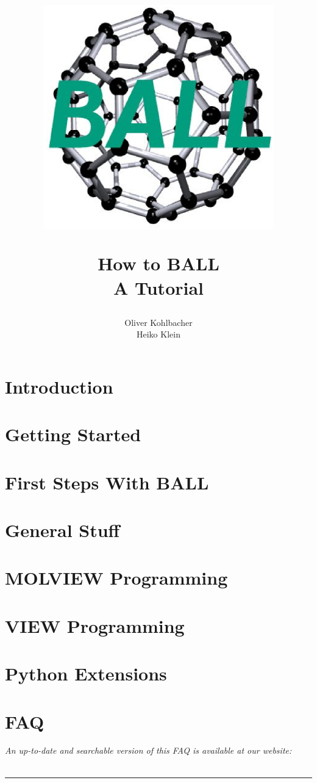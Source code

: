 \documentclass[12pt,twoside]{report}
\author{Oliver Kohlbacher\\ Heiko Klein}
\title{
	\begin{center}
		\includegraphics[width=10cm]{logo.eps}
	\end{center}
	\Huge How to BALL\\ 
	\Large A Tutorial
}
\begin{document}
\maketitle

\setcounter{page}{1}
\tableofcontents
{}
\setcounter{page}{1}


\chapter{Introduction}
\label{chapter:introduction}



\chapter{Getting Started}
\label{chapter:getting-started}




\chapter{First Steps With BALL}
\label{chapter:first-steps}




\chapter{General Stuff}
\label{chapter:general-stuff}



\chapter{MOLVIEW Programming}
\label{chapter:molview-programming}


\chapter{VIEW Programming}
\label{chapter:view-programming}


\chapter{Python Extensions}
\label{chapter:python}


\chapter{FAQ}
\label{chapter:faq}
\newpage
\noindent
{\it An up-to-date and searchable version of this FAQ is available at our website:\\
}\\
\hspace{1mm}
\rule{\textwidth}{0.1pt}
\hspace{3mm}



\newpage
{}
\printindex
\renewcommand{\bibname}{References}


\end{document}
